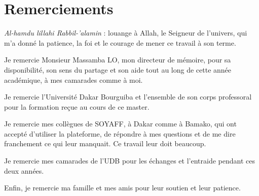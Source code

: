 \chapter*{Remerciements}

\textit{Al-hamdu lillahi Rabbil-'alamin} : louange à Allah, le Seigneur de l'univers, qui m'a donné la patience, la foi et le courage de mener ce travail à son terme.

Je remercie Monsieur Massamba LO, mon directeur de mémoire, pour sa disponibilité, son sens du partage et son aide tout au long de cette année académique, à mes camarades comme à moi.

Je remercie l'Université Dakar Bourguiba et l'ensemble de son corps professoral pour la formation reçue au cours de ce master.

Je remercie mes collègues de SOYAFF, à Dakar comme à Bamako, qui ont accepté d'utiliser la plateforme, de répondre à mes questions et de me dire franchement ce qui leur manquait. Ce travail leur doit beaucoup.

Je remercie mes camarades de l'UDB pour les échanges et l'entraide pendant ces deux années.

Enfin, je remercie ma famille et mes amis pour leur soutien et leur patience.
